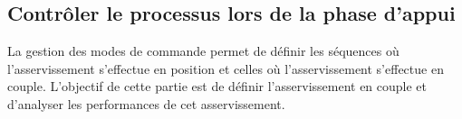 \documentclass[10pt,fleqn]{article} %
\begin{document}
\begin{multicols}{2}
%
%
%
%
%
%
%

\subsection*{Contrôler le processus lors de la phase d'appui}

\begin{obj}
La gestion des modes de commande permet de définir les séquences où l'asservissement s'effectue en
position et celles où l'asservissement s'effectue en couple. L'objectif de cette partie est de définir l'asservissement
en couple et d'analyser les performances de cet asservissement.
\end{obj}


\end{multicols}
\end{document}
